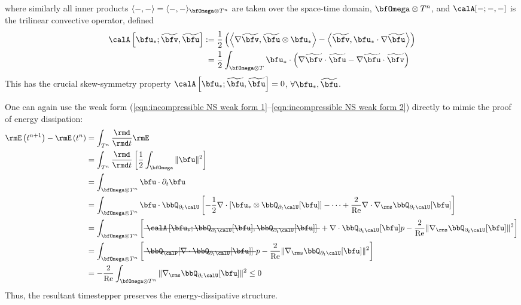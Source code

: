     where similarly all inner products $\langle -, -\rangle  =  \langle -, -\rangle_{\bfOmega\otimes T^{n}}$ are taken over the space-time domain, $\bfOmega\otimes T^{n}$, and $\calA[-; -, -]$ is the trilinear convective operator, defined
    \begin{align}
        \calA\left[\bfu_{*}; \widetilde{\bfv}, \widetilde{\bfu}\right]  :=  &\;\frac{1}{2}\left(\left\langle\nabla\widetilde{\bfv}, \widetilde{\bfu}\otimes\bfu_{*}\right\rangle - \left\langle\widetilde{\bfv}, \bfu_{*}\cdot\nabla\widetilde{\bfu}\right\rangle\right)  \label{eqn:convective operator definition}  \\
                                                                         =  &\;\frac{1}{2}\int_{\bfOmega\otimes T}\bfu_{*}\cdot\left(\nabla\widetilde{\bfv}\cdot\widetilde{\bfu} - \nabla\widetilde{\bfu}\cdot\widetilde{\bfv}\right)
    \end{align}
    This has the crucial skew-symmetry property $\calA\left[\bfu_{*}; \widetilde{\bfu}, \widetilde{\bfu}\right]  =  0$, $\forall \bfu_{*}, \widetilde{\bfu}$.

    \begin{remark}
    \end{remark}

    One can again use the weak form (\ref{eqn:incompressible NS weak form 1}--\ref{eqn:incompressible NS weak form 2}) directly to mimic the proof of energy dissipation:
    \begin{align}
        \rmE\left(t^{n + 1}\right) - \rmE\left(t^{n}\right)  &=  \int_{T^{n}}\frac{\rmd}{\rmd t}\rmE  \\
        &=  \int_{T^{n}}\frac{\rmd}{\rmd t}\left[\frac{1}{2}\int_{\bfOmega}\|\bfu\|^{2}\right]  \\
        &=  \int_{\bfOmega\otimes T^{n}}\bfu\cdot\partial_{t}\bfu  \\
        &=  \int_{\bfOmega\otimes T^{n}}\bfu\cdot\bbQ_{\partial_{t}\calU}\left[- \frac{1}{2}\nabla\cdot\left[\bfu_{*}\otimes\bbQ_{\partial_{t}\calU}[\bfu]\right] - \cdots + \frac{2}{\rmRe}\nabla\cdot\nabla_{\rms}\bbQ_{\partial_{t}\calU}[\bfu]\right]  \\
        &=  \int_{\bfOmega\otimes T^{n}}\left[\mst{\calA\left[\bfu_{*}; \bbQ_{\partial_{t}\calU}[\bfu], \bbQ_{\partial_{t}\calU}[\bfu]\right]} + \nabla\cdot\bbQ_{\partial_{t}\calU}[\bfu]p - \frac{2}{\rmRe}\|\nabla_{\rms}\bbQ_{\partial_{t}\calU}[\bfu]\|^{2}\right]  \\
        &=  \int_{\bfOmega\otimes T^{n}}\left[\mst{\bbQ_{\calP}[\nabla\cdot\bbQ_{\partial_{t}\calU}[\bfu]]}p - \frac{2}{\rmRe}\|\nabla_{\rms}\bbQ_{\partial_{t}\calU}[\bfu]\|^{2}\right]  \\
        &=  - \frac{2}{\rmRe}\int_{\bfOmega\otimes T^{n}}\|\nabla_{\rms}\bbQ_{\partial_{t}\calU}[\bfu]\|^{2}  \leq  0  \label{eqn:incompressible NS weak form dissipation}
    \end{align}
    Thus, the resultant timestepper preserves the energy-dissipative structure.

